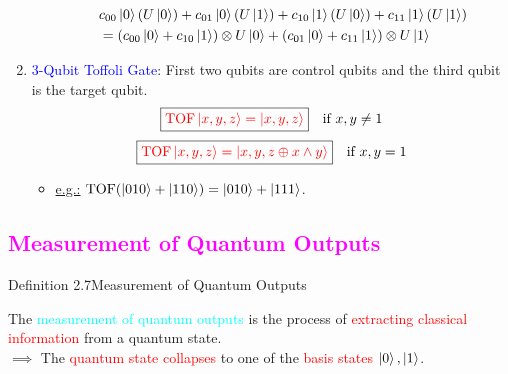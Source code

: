 \documentclass{book}
\begin{document}
\begin{enumerate}
\begin{itemize}
\begin{align*}
            & c_{00}\ket{0}(U\ket{0}) + c_{01}\ket{0}(U\ket{1}) + c_{10}\ket{1}(U\ket{0}) + c_{11}\ket{1}(U\ket{1}) \\
            &= (c_{00}\ket{0} + c_{10}\ket{1}) \otimes U\ket{0} + (c_{01}\ket{0} + c_{11}\ket{1}) \otimes U\ket{1}
        \end{align*}
    \end{itemize}
    \newpage
    \item \textcolor{blue}{3-Qubit Toffoli Gate}: First two qubits are control qubits and the third qubit is the target qubit.
    \[
        \boxed{\textcolor{red}{\text{TOF}\ket{x, y, z} = \ket{x, y, z}}} \quad \text{if } x, y \neq 1
    \]
    \[
        \boxed{\textcolor{red}{\text{TOF}\ket{x, y, z} = \ket{x, y, z \oplus x \land y}}} \quad \text{if } x, y = 1
    \]
    \begin{center}
    \end{center}
    \begin{itemize}
        \item \uline{e.g.:} \(\text{TOF}(\ket{010} + \ket{110}) = \ket{010} + \ket{111}\).
    \end{itemize}
\end{enumerate}
\textcolor{magenta}{\section{\textbf{Measurement of Quantum Outputs}}}
\begin{defBox}{Definition 2.7}{Measurement of Quantum Outputs}
    \raggedright
    The \textcolor{cyan}{measurement of quantum outputs} is the process of \textcolor{red}{extracting classical information} from a quantum state.\\
    $\implies$ The \textcolor{red}{quantum state collapses} to one of the \textcolor{red}{basis states} \textcolor{brown}{\(\ket{0}, \ket{1}\)}.
\end{defBox}
\end{document}
